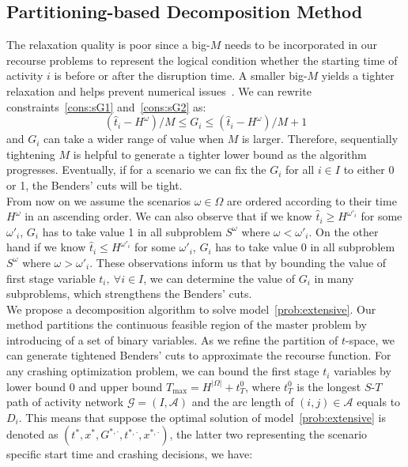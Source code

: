 \documentclass[11pt]{article}
\begin{document}
	\subsection{Partitioning-based Decomposition Method} \label{subsec:partition}
	The relaxation quality is poor since a big-\(M\) needs to be incorporated in our recourse problems to represent the logical condition whether the starting time of activity \(i\) is before or after the disruption time. A smaller big-\(M\) yields a tighter relaxation and helps prevent numerical issues~\cite{camm1990cutting,klotz2013practical}. We can rewrite constraints~\eqref{cons:sG1} and~\eqref{cons:sG2} as:
	\begin{equation} \label{cons:Grange}
	(\hat{t}_i - H^\omega)/M \leq G_i \leq (\hat{t}_i - H^\omega)/M + 1
	\end{equation}
	and \(G_i\) can take a wider range of value when \(M\) is larger. Therefore, sequentially tightening \(M\) is helpful to generate a tighter lower bound as the algorithm progresses. Eventually, if for a scenario we can fix the \(G_i\) for all \(i \in I\) to either 0 or 1, the Benders' cuts will be tight.\\
	\newline
	From now on we assume the scenarios \(\omega \in \Omega\) are ordered according to their time \(H^\omega\) in an ascending order. We can also observe that if we know \(\hat{t}_i \geq H^{\omega'_i}\) for some \(\omega'_i\), \(G_i\) has to take value 1 in all subproblem \(S^\omega\) where \(\omega < \omega'_i\). On the other hand if we know \(\hat{t}_i \leq H^{\omega'_i}\) for some \(\omega'_i\), \(G_i\) has to take value 0 in all subproblem \(S^\omega\) where \(\omega > \omega'_i\). These observations inform us that by bounding the value of first stage variable \(t_i,\ \forall i \in I\), we can determine the value of \(G_i\) in many subproblems, which strengthens the Benders' cuts.\\
	\newline
	We propose a decomposition algorithm to solve model~\eqref{prob:extensive}. Our method partitions the continuous feasible region of the master problem by introducing of a set of binary variables. As we refine the partition of \(t\)-space, we can generate tightened Benders' cuts to approximate the recourse function. For any crashing optimization problem, we can bound the first stage \(t_i\) variables by lower bound \(0\) and upper bound \(T_{\max} = H^{|\Omega|} + t_T^0\), where \(t_T^0\) is the longest \(S\)-\(T\) path of activity network \(\mathcal{G} = (I,\mathcal{A})\) and the arc length of \((i,j) \in \mathcal{A}\) equals to \(D_i\). This means that suppose the optimal solution of model~\eqref{prob:extensive} is denoted as \((t^*,x^*,G^{*,\cdot},t^{*,\cdot},x^{*,\cdot})\), the latter two representing the scenario specific start time and crashing decisions, we have:
\end{document}
